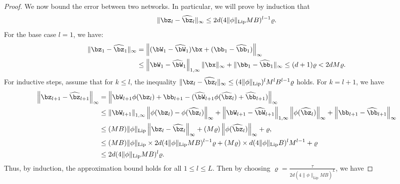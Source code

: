 \documentclass[11pt]{article}
\begin{document}
\begin{proof}
    We now bound the error between two networks. In particular, we will prove by induction that
    \begin{equation*}
        \|\bz_{l} - \widehat{\bz}_l\|_{\infty} \leq 2d (4 \|\phi\|_{\mathrm{Lip}} M B)^{l-1}  \varrho.
    \end{equation*}
    For the base case $l=1$, we have:
    \begin{equation*}
        \begin{aligned}
            \|\bz_1 - \widehat{\bz}_1\|_{\infty} & =  \left\|(\bW_1 - \widehat{\bW}_1)\bx + (\bb_1 - \widehat{\bb}_1)\right\|_\infty \\
            & \leq \left\| \bW_1 - \widehat{\bW}_1\right\|_{1, \infty} \|\bx\|_{\infty} + \| \bb_1 - \widehat{\bb}_1 \|_{\infty} \leq (d+1) \varrho < 2 d M \varrho.
        \end{aligned}
    \end{equation*}
    For inductive steps, assume that for $k \leq l$, the inequality  $\|\bz_{l} - \widehat{\bz}_l\|_{\infty} \leq (4 \|\phi\|_{\mathrm{Lip}})^{l} M^{l} B^{l-1} \varrho$ holds. For $k = l+1$, we have 
    \begin{equation*}
        \begin{aligned}
            \left\|\bz_{l+1} - \widehat{\bz}_{l+1}\right\|_\infty &= \left\|\bW_{l+1} \phi(\bz_{l}) + \bb_{l+1} - (\widehat{\bW}_{l+1} \phi(\widehat{\bz}_{l}) + \widehat{\bb}_{l+1})\right\|_\infty \\
            &\le \left\|\bW_{l+1}\right\|_{1,\infty} \left\|\phi(\bz_{l}) - \phi(\widehat{\bz}_{l})\right\|_\infty + \left\|\bW_{l+1} - \widehat{\bW}_{l+1}\right\|_{1, \infty} \left\|\phi(\widehat{\bz}_{l})\right\|_\infty + \left\|\bb_{l+1} - \widehat{\bb}_{l+1}\right\|_\infty \\
            &\le (MB) \|\phi\|_{\mathrm{Lip}} \left\|\bz_{l} - \widehat{\bz}_{l}\right\|_\infty + (M\varrho) \left\|\phi(\widehat{\bz}_{l})\right\|_\infty + \varrho, \\
            & \leq (MB) \|\phi\|_{\mathrm{Lip}} \times 2d (4\|\phi\|_{\mathrm{Lip}} M B)^{l-1} \varrho + (M \varrho) \times  d (4 \|\phi\|_{\mathrm{Lip}} B)^{l} M^{l-1}+ \varrho \\
            & \leq 2 d (4\|\phi\|_{\mathrm{Lip}} MB )^{l}  \varrho.
        \end{aligned}
    \end{equation*}
    Thus, by induction, the approximation bound holds for all $1 \leq l \leq L$. Then by choosing $\varrho = \frac{\tau}{ 2d(4 \|\phi\|_{\mathrm{Lip}} MB)^{L}}$, we have 

\end{proof}
\end{document}
